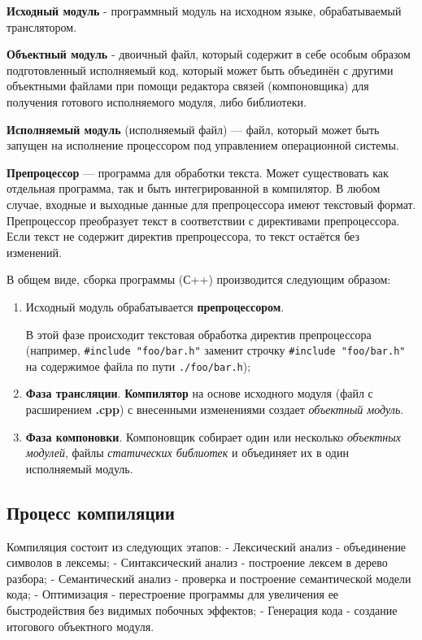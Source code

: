\textbf{Исходный модуль} - программный модуль на исходном языке,
обрабатываемый транслятором.

\textbf{Объектный модуль} - двоичный файл, который содержит в себе
особым образом подготовленный исполняемый код, который может быть
объединён с другими объектными файлами при помощи редактора связей
(компоновщика) для получения готового исполняемого модуля, либо
библиотеки.

\textbf{Исполняемый модуль} (исполняемый файл) --- файл, который может
быть запущен на исполнение процессором под управлением операционной
системы.

\textbf{Препроцессор} --- программа для обработки текста. Может
существовать как отдельная программа, так и быть интегрированной в
компилятор. В любом случае, входные и выходные данные для препроцессора
имеют текстовый формат. Препроцессор преобразует текст в соответствии с
директивами препроцессора. Если текст не содержит директив
препроцессора, то текст остаётся без изменений.

В общем виде, сборка программы (С++) производится следующим образом:

\begin{enumerate}
\def\labelenumi{\arabic{enumi})}
\item
  Исходный модуль обрабатывается \textbf{препроцессором}.

  В этой фазе происходит текстовая обработка директив препроцессора
  (например, \texttt{\#include\ "foo/bar.h"} заменит строчку
  \texttt{\#include\ "foo/bar.h"} на содержимое файла по пути
  \texttt{./foo/bar.h});
\item
  \textbf{Фаза трансляции}. \textbf{Компилятор} на основе исходного
  модуля (файл с расширением \textbf{.cpp}) с внесенными изменениями
  создает \emph{объектный модуль}.
\item
  \textbf{Фаза компоновки}. Компоновщик собирает один или несколько
  \emph{объектных модулей}, файлы \emph{статических библиотек} и
  объединяет их в один исполняемый модуль.
\end{enumerate}

\subsection{Процесс компиляции}

Компиляция состоит из следующих этапов: - Лексический анализ -
объединение символов в лексемы; - Синтаксический анализ - построение
лексем в дерево разбора; - Семантический анализ - проверка и построение
семантической модели кода; - Оптимизация - перестроение программы для
увеличения ее быстродействия без видимых побочных эффектов; - Генерация
кода - создание итогового объектного модуля.

